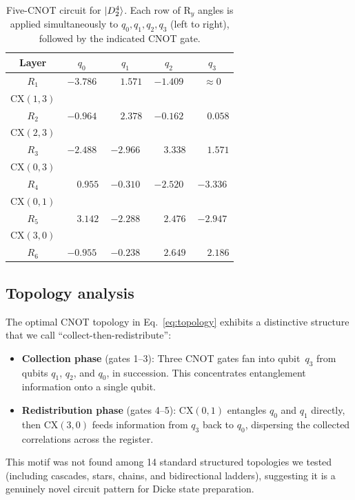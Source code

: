 \documentclass[twocolumn,10pt]{article}
\newcommand{\Ry}{\mathrm{R}_y}
\newcommand{\CX}{\mathrm{CX}}
\begin{document}
\begin{table}[t]
\centering
\caption{Five-CNOT circuit for $\ket{D_2^4}$. Each row of $\Ry$ angles is
applied simultaneously to $q_0, q_1, q_2, q_3$ (left to right), followed by
the indicated CNOT gate.}
\label{tab:circuit}
\begin{tabular}{ccccc}
\toprule
Layer & $q_0$ & $q_1$ & $q_2$ & $q_3$ \\
\midrule
$R_1$ & $-3.786$ & $\phantom{-}1.571$ & $-1.409$ & $\approx 0$ \\
$\CX(1,3)$ & & & & \\
$R_2$ & $-0.964$ & $\phantom{-}2.378$ & $-0.162$ & $\phantom{-}0.058$ \\
$\CX(2,3)$ & & & & \\
$R_3$ & $-2.488$ & $-2.966$ & $\phantom{-}3.338$ & $\phantom{-}1.571$ \\
$\CX(0,3)$ & & & & \\
$R_4$ & $\phantom{-}0.955$ & $-0.310$ & $-2.520$ & $-3.336$ \\
$\CX(0,1)$ & & & & \\
$R_5$ & $\phantom{-}3.142$ & $-2.288$ & $\phantom{-}2.476$ & $-2.947$ \\
$\CX(3,0)$ & & & & \\
$R_6$ & $-0.955$ & $-0.238$ & $\phantom{-}2.649$ & $\phantom{-}2.186$ \\
\bottomrule
\end{tabular}
\end{table}

\subsection{Topology analysis}

The optimal CNOT topology in Eq.~\eqref{eq:topology} exhibits a distinctive
structure that we call ``collect-then-redistribute'':
\begin{itemize}
    \item \textbf{Collection phase} (gates 1--3): Three CNOT gates fan into
    qubit~$q_3$ from qubits $q_1$, $q_2$, and $q_0$, in succession. This
    concentrates entanglement information onto a single qubit.
    \item \textbf{Redistribution phase} (gates 4--5): $\CX(0,1)$ entangles
    $q_0$ and $q_1$ directly, then $\CX(3,0)$ feeds information from $q_3$
    back to $q_0$, dispersing the collected correlations across the register.
\end{itemize}
This motif was not found among 14 standard structured topologies we tested
(including cascades, stars, chains, and bidirectional ladders), suggesting it is
a genuinely novel circuit pattern for Dicke state preparation.
\end{document}
